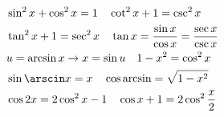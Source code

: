 \begin{align}
     & \sin^2 x +\cos^2 x = 1 \quad \cot^2 x+1 = \csc^2 x                                  \\
     & \tan^2 x+1 = \sec^2 x \quad \tan x = \frac{\sin x}{\cos x} = \frac{\sec x}{ \csc x} \\
     & u = \arcsin x \to x=\sin u \quad 1-x^2 = \cos^2 x                                   \\
     & \sin\arscin x = x \quad \cos\arcsin = \sqrt{1-x^2}                                  \\
     & \cos 2x = 2\cos^2 x - 1 \quad \cos x + 1 = 2\cos^2 \frac{x}{2}
\end{align}